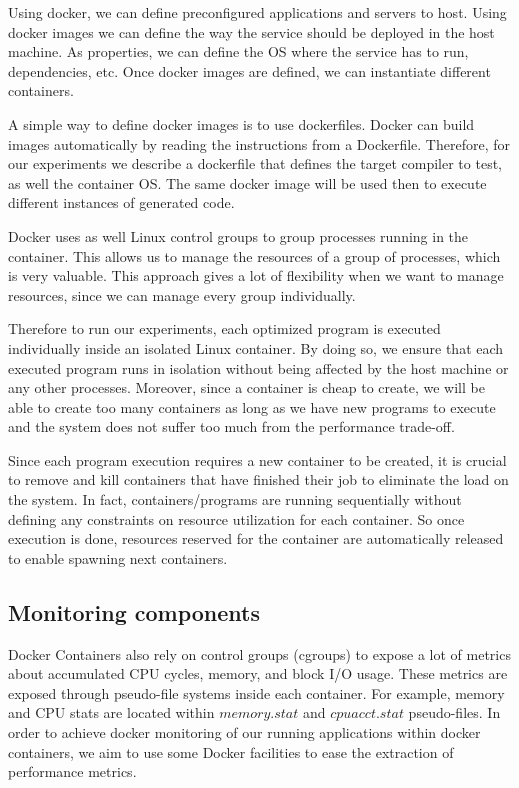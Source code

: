 Using docker, we can define preconfigured applications and servers to host. Using docker images we can define the way the service should be deployed in the host machine. As properties, we can define the OS where the service has to run, dependencies, etc. Once docker images are defined, we can instantiate different containers.

A simple way to define docker images is to use dockerfiles. Docker can build images automatically by reading the instructions from a Dockerfile. Therefore, for our experiments we describe a dockerfile that defines the target compiler to test, as well the container OS. The same docker image will be used then to execute different instances of generated code.

Docker uses as well Linux control groups to group processes running in the container. This allows us to manage the resources of a group of processes, which is very valuable. This approach gives a lot of flexibility when we want to manage resources, since we can manage every group individually. 

Therefore to run our experiments, each optimized program is executed individually inside an isolated Linux container. By doing so, we ensure that each executed program runs in isolation without being affected by the host machine or any other processes. Moreover, since a container is cheap to create, we will be able to create too many containers as long as we have new programs to execute and the system does not suffer too much from the performance trade-off.

Since each program execution requires a new container to be created, it is crucial to remove and kill containers that have finished their job to eliminate the load on the system. In fact, containers/programs are running sequentially without defining any constraints on resource utilization for each container. So once execution is done, resources reserved for the container are automatically released to enable spawning next containers.

\subsection{Monitoring components}
Docker Containers also rely on control groups (cgroups) to expose a lot of metrics about accumulated CPU cycles, memory, and block I/O usage. These metrics are exposed through pseudo-file systems inside each container. For example, memory and CPU stats are located within $memory.stat$ and $cpuacct.stat$ pseudo-files.
In order to achieve docker monitoring of our running applications within docker containers, we aim to use some Docker facilities to ease the extraction of performance metrics.
